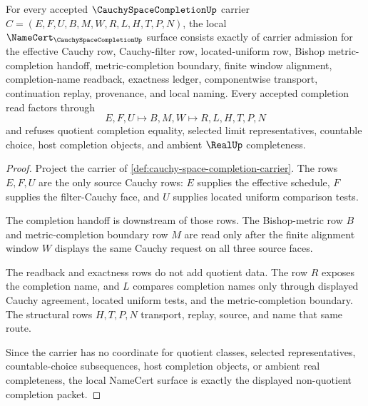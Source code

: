 \begin{theorem}
\label{thm:cauchy-space-completion-namecert-obligations}
For every accepted $\CauchySpaceCompletionUp$ carrier $C=(E,F,U,B,M,W,R,L,H,T,P,N)$, the local $\NameCert_{\CauchySpaceCompletionUp}$ surface consists exactly of carrier admission for the effective Cauchy row, Cauchy-filter row, located-uniform row, Bishop metric-completion handoff, metric-completion boundary, finite window alignment, completion-name readback, exactness ledger, componentwise transport, continuation replay, provenance, and local naming. Every accepted completion read factors through
$$
E,F,U \longmapsto B,M,W \longmapsto R,L,H,T,P,N
$$
and refuses quotient completion equality, selected limit representatives, countable choice, host completion objects, and ambient $\RealUp$ completeness.
\end{theorem}
\begin{proof}
Project the carrier of \autoref{def:cauchy-space-completion-carrier}. The rows $E,F,U$ are the only source Cauchy rows: $E$ supplies the effective schedule, $F$ supplies the filter-Cauchy face, and $U$ supplies located uniform comparison tests.

The completion handoff is downstream of those rows. The Bishop-metric row $B$ and metric-completion boundary row $M$ are read only after the finite alignment window $W$ displays the same Cauchy request on all three source faces.

The readback and exactness rows do not add quotient data. The row $R$ exposes the completion name, and $L$ compares completion names only through displayed Cauchy agreement, located uniform tests, and the metric-completion boundary. The structural rows $H,T,P,N$ transport, replay, source, and name that same route.

Since the carrier has no coordinate for quotient classes, selected representatives, countable-choice subsequences, host completion objects, or ambient real completeness, the local NameCert surface is exactly the displayed non-quotient completion packet.
\end{proof}


